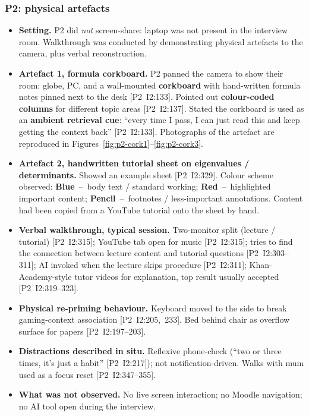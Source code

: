 \documentclass[a4paper,11pt]{article}
\begin{document}
\subsubsection*{P2: physical artefacts}\label{app:obs-p2}
\begin{itemize}[leftmargin=1.2em,itemsep=2pt]
    \item \textbf{Setting.} P2 did \emph{not} screen-share: laptop was
          not present in the interview room. Walkthrough was conducted
          by demonstrating physical artefacts to the camera, plus
          verbal reconstruction.
    \item \textbf{Artefact 1, formula corkboard.} P2 panned the
          camera to show their room: globe, PC, and a wall-mounted
          \textbf{corkboard} with hand-written formula notes pinned
          next to the desk [P2~I2:133]. Pointed out
          \textbf{colour-coded columns} for different topic areas
          [P2~I2:137]. Stated the corkboard is used as an
          \textbf{ambient retrieval cue}: ``every time I pass, I can
          just read this and keep getting the context back''
          [P2~I2:133]. Photographs of the artefact are reproduced in
          Figures~\ref{fig:p2-cork1}--\ref{fig:p2-cork3}.
    \item \textbf{Artefact 2, handwritten tutorial sheet on
          eigenvalues / determinants.} Showed an example sheet
          [P2~I2:329]. Colour scheme observed:
          \textbf{Blue}~--~body text / standard working;
          \textbf{Red}~--~highlighted important content;
          \textbf{Pencil}~--~footnotes / less-important annotations.
          Content had been copied from a YouTube tutorial onto the
          sheet by hand.
    \item \textbf{Verbal walkthrough, typical session.}
          Two-monitor split (lecture / tutorial) [P2~I2:315]; YouTube
          tab open for music [P2~I2:315]; tries to find the connection
          between lecture content and tutorial questions
          [P2~I2:303--311]; AI invoked when the lecture skips
          procedure [P2~I2:311]; Khan-Academy-style tutor videos for
          explanation, top result usually accepted [P2~I2:319--323].
    \item \textbf{Physical re-priming behaviour.} Keyboard moved to
          the side to break gaming-context association
          [P2~I2:205,~233]. Bed behind chair as overflow surface for
          papers [P2~I2:197--203].
    \item \textbf{Distractions described in situ.} Reflexive
          phone-check (``two or three times, it's just a habit''
          [P2~I2:217]); not notification-driven. Walks with mum used
          as a focus reset [P2~I2:347--355].
    \item \textbf{What was not observed.} No live screen interaction;
          no Moodle navigation; no AI tool open during the interview.
\end{itemize}
\end{document}
